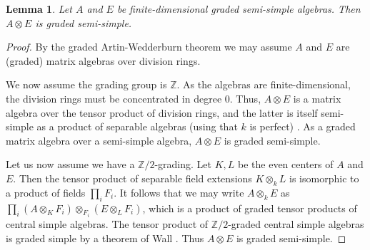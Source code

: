 \documentclass[a4paper]{amsart}
\theoremstyle{plain}
\newtheorem{lem}[thm]{Lemma}
\theoremstyle{definition}
\theoremstyle{remark}
\newcommand{\Z}{\mathbb{Z}}
\numberwithin{equation}{section}
\theoremstyle{plain}
\begin{document}
		\begin{lem}\label{lem:sstensor}
			Let $A$ and $E$ be finite-dimensional graded semi-simple algebras. Then $A \otimes E$ is graded semi-simple.
					\end{lem}
					\begin{proof}
					By the graded Artin-Wedderburn theorem \cite[Theorem 2.10.10]{NastasescuVanOystaeyen2004} we may assume  $A$ and $E$ are (graded) matrix algebras over division rings.
												
						We now assume the grading group is $\Z$. 
						As the algebras are finite-dimensional, the division rings must be concentrated in degree 0.
					Thus, $A \otimes E$ is a matrix algebra over the tensor product of division rings, and the latter is itself semi-simple as a product of separable algebras (using that $k$ is perfect)  \cite[\S 10.5, \S 10.7]{Pierce1982}.
												As a graded matrix algebra over a semi-simple algebra, $A \otimes E$ is graded semi-simple.
												
%						
%						
				Let us now assume we have a $\Z/2$-grading. Let $K, L$ be the even centers of $A$ and $E$. 
						Then the tensor product of separable field extensions $K \otimes_k L$ is isomorphic to a product of fields $\prod_i F_i$.
						It follows that we may write $A \otimes_k E$ as $\prod_i (A\otimes_K F_i) \otimes_{F_i} (E \otimes_L F_i)$, which is a product of graded tensor products of central simple algebras. The tensor product of $\Z/2$-graded central simple algebras is graded simple by a theorem of Wall \cite[Theorem 2]{Wall1964}. Thus $A\otimes E$ is graded semi-simple.					
					\end{proof}
\end{document}
